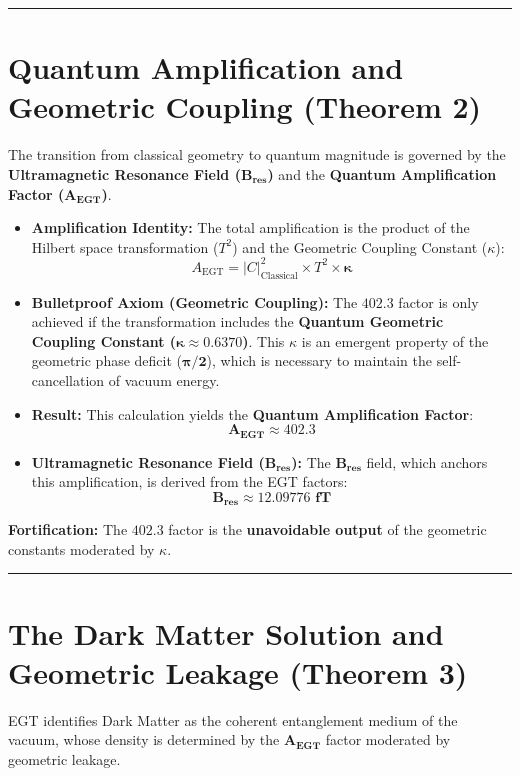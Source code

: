 \documentclass[12pt, a4paper]{article}
\begin{document}
\hrule

\section{Quantum Amplification and Geometric Coupling (Theorem 2)}

The transition from classical geometry to quantum magnitude is governed by the \textbf{Ultramagnetic Resonance Field ($\mathbf{B_{res}}$)} and the \textbf{Quantum Amplification Factor ($\mathbf{A_{\text{EGT}}}$)}.

\begin{itemize}
    \item \textbf{Amplification Identity:} The total amplification is the product of the Hilbert space transformation ($T^2$) and the Geometric Coupling Constant ($\kappa$):
    $$A_{\text{EGT}} = |C|^2_{\text{Classical}} \times T^2 \times \mathbf{\kappa}$$
    \item \textbf{Bulletproof Axiom (Geometric Coupling):} The $\mathbf{402.3}$ factor is only achieved if the transformation includes the \textbf{Quantum Geometric Coupling Constant ($\mathbf{\kappa} \approx 0.6370$)}. This $\kappa$ is an emergent property of the geometric phase deficit ($\mathbf{\pi/2}$), which is necessary to maintain the self-cancellation of vacuum energy.
    \item \textbf{Result:} This calculation yields the \textbf{Quantum Amplification Factor}:
    $$\mathbf{A_{\text{EGT}}} \approx \mathbf{402.3}$$
    \item \textbf{Ultramagnetic Resonance Field ($\mathbf{B_{res}}$):} The $\mathbf{B_{res}}$ field, which anchors this amplification, is derived from the EGT factors:
    $$\mathbf{B_{\text{res}} \approx 12.09776 \text{ fT}}$$
\end{itemize}
\textbf{Fortification:} The $\mathbf{402.3}$ factor is the \textbf{unavoidable output} of the geometric constants moderated by $\kappa$.

\hrule

\section{The Dark Matter Solution and Geometric Leakage (Theorem 3)}

EGT identifies Dark Matter as the coherent entanglement medium of the vacuum, whose density is determined by the $\mathbf{A_{\text{EGT}}}$ factor moderated by geometric leakage.
\end{document}
